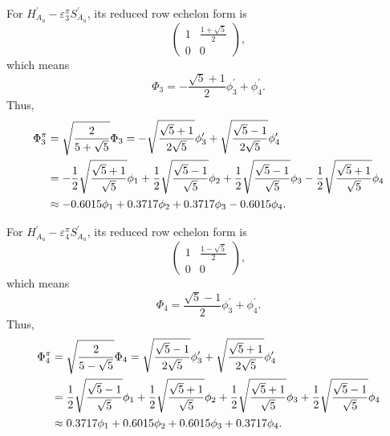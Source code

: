 \documentclass[a4paper]{book}
\newcommand{\Hp}{H^\prime}
\newcommand{\Sp}{S^\prime}
\begin{document}
\begin{solution}
\begin{enumerate}[label=(\alph*)]
		For $\Hp_{A_u}-\varepsilon^\pi_3 \Sp_{A_u}$, its reduced row echelon form is
		\begin{equation*}
			\begin{pmatrix}
				1	& \frac{1+\sqrt{5}}{2}	\\	0	&	0
			\end{pmatrix},
		\end{equation*}		
		which means
		\begin{equation*}
			\Phi_3 = -\frac{\sqrt{5}+1}{2}\phi^\prime_3 + \phi^\prime_4.
		\end{equation*}
		Thus,
		\begin{align}
			\Phi^\pi_3 &= \sqrt{ \frac{2}{5+\sqrt{5}} } \Phi_3 = -\sqrt{\frac{\sqrt{5}+1}{2\sqrt{5}}} \phi^\prime_3 + \sqrt{\frac{\sqrt{5}-1}{2\sqrt{5}}} \phi^\prime_4 \notag	\\
			&= -\frac{1}{2}\sqrt{\frac{\sqrt{5}+1}{\sqrt{5}}}\phi_1  + \frac{1}{2}\sqrt{\frac{\sqrt{5}-1}{\sqrt{5}}} \phi_2 + \frac{1}{2}\sqrt{\frac{\sqrt{5}-1}{\sqrt{5}}} \phi_3 - \frac{1}{2}\sqrt{\frac{\sqrt{5}+1}{\sqrt{5}}} \phi_4 \notag \\
			&\approx -0.6015 \phi_1 + 0.3717 \phi_2 + 0.3717 \phi_3 - 0.6015 \phi_4.
		\end{align}
		
		For $\Hp_{A_u}-\varepsilon^\pi_4 \Sp_{A_u}$, its reduced row echelon form is
		\begin{equation*}
			\begin{pmatrix}
				1	& \frac{1-\sqrt{5}}{2}	\\	0	&	0
			\end{pmatrix},
		\end{equation*}		
		which means
		\begin{equation*}
			\Phi_4 = \frac{\sqrt{5}-1}{2}\phi^\prime_3 + \phi^\prime_4.
		\end{equation*}
		Thus,		
		\begin{align}
			\Phi^\pi_4 &= \sqrt{ \frac{2}{5-\sqrt{5}} } \Phi_4 = \sqrt{\frac{\sqrt{5}-1}{2\sqrt{5}}} \phi^\prime_3 + \sqrt{\frac{\sqrt{5}+1}{2\sqrt{5}}} \phi^\prime_4 \notag	\\
			&= \frac{1}{2}\sqrt{\frac{\sqrt{5}-1}{\sqrt{5}}}\phi_1  + \frac{1}{2}\sqrt{\frac{\sqrt{5}+1}{\sqrt{5}}} \phi_2 + \frac{1}{2}\sqrt{\frac{\sqrt{5}+1}{\sqrt{5}}} \phi_3 + \frac{1}{2}\sqrt{\frac{\sqrt{5}-1}{\sqrt{5}}} \phi_4 \notag \\
			&\approx 0.3717 \phi_1 + 0.6015 \phi_2 + 0.6015 \phi_3 + 0.3717 \phi_4.
		\end{align}
		

\end{enumerate}
\end{solution}
\end{document}
